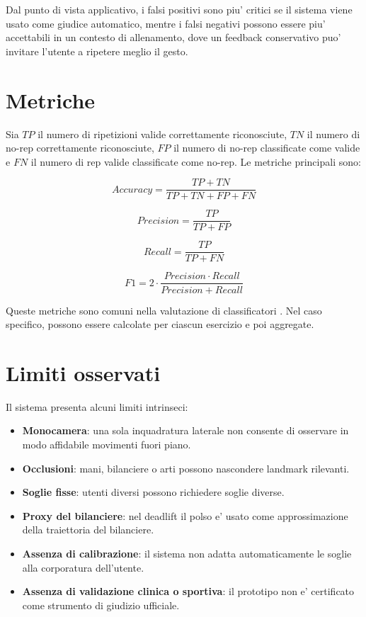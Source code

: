 Dal punto di vista applicativo, i falsi positivi sono piu' critici se il sistema viene usato come giudice automatico, mentre i falsi negativi possono essere piu' accettabili in un contesto di allenamento, dove un feedback conservativo puo' invitare l'utente a ripetere meglio il gesto.

\section{Metriche}

Sia $TP$ il numero di ripetizioni valide correttamente riconosciute, $TN$ il numero di no-rep correttamente riconosciute, $FP$ il numero di no-rep classificate come valide e $FN$ il numero di rep valide classificate come no-rep. Le metriche principali sono:

\begin{equation}
Accuracy = \frac{TP + TN}{TP + TN + FP + FN}
\end{equation}

\begin{equation}
Precision = \frac{TP}{TP + FP}
\end{equation}

\begin{equation}
Recall = \frac{TP}{TP + FN}
\end{equation}

\begin{equation}
F1 = 2 \cdot \frac{Precision \cdot Recall}{Precision + Recall}
\end{equation}

Queste metriche sono comuni nella valutazione di classificatori \cite{geron2019hands}. Nel caso specifico, possono essere calcolate per ciascun esercizio e poi aggregate.

\section{Limiti osservati}

Il sistema presenta alcuni limiti intrinseci:

\begin{itemize}
  \item \textbf{Monocamera}: una sola inquadratura laterale non consente di osservare in modo affidabile movimenti fuori piano.
  \item \textbf{Occlusioni}: mani, bilanciere o arti possono nascondere landmark rilevanti.
  \item \textbf{Soglie fisse}: utenti diversi possono richiedere soglie diverse.
  \item \textbf{Proxy del bilanciere}: nel deadlift il polso e' usato come approssimazione della traiettoria del bilanciere.
  \item \textbf{Assenza di calibrazione}: il sistema non adatta automaticamente le soglie alla corporatura dell'utente.
  \item \textbf{Assenza di validazione clinica o sportiva}: il prototipo non e' certificato come strumento di giudizio ufficiale.
\end{itemize}

